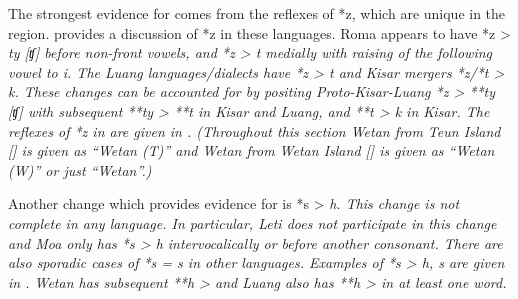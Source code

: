 The strongest evidence for  comes from the reflexes
of *z, which are unique in the region.
\citet[289f]{Mills2010} provides a discussion of *z in these languages.
Roma appears to have *z > \it{ty} [ʧ] before non-front vowels,
and *z > \it{t} medially with raising of the following vowel to \it{i}.
The Luang languages/dialects have *z > \it{t}
and Kisar mergers *z/*t > \it{k}.
These changes can be accounted for by positing Proto-Kisar-Luang
*z > **ty [ʧ] with subsequent **ty > **t in Kisar
and Luang, and **t > \it{k} in Kisar.
The reflexes of *z in are given in .
(Throughout this section Wetan from Teun Island [\citealp{Chlenova2006}]
is given as “Wetan (T)”
and Wetan from Wetan Island
[\citealp{DeJosselinDeJong1987}] is given
as “Wetan (W)” or just “Wetan”.)

Another change which provides evidence for 
is *s > \it{h}.
This change is not complete in any language.
In particular, Leti does not participate in this change
and Moa only has *s > \it{h} intervocalically or before another consonant.
There are also sporadic cases of *s = \it{s} in other languages.
Examples of *s > \it{h,
s} are given in .
Wetan has subsequent **h > {\0}
and Luang also has **h > {\0} in at least one word.


